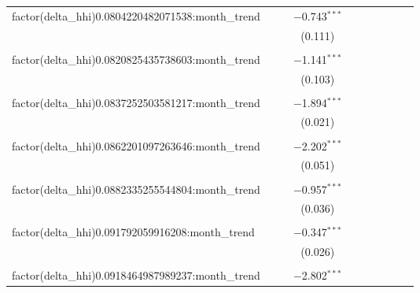 \begin{table}[H]
{\begin{tabular}{@{\extracolsep{5pt}}lccccccccc}
  factor(delta\_hhi)0.0804220482071538:month\_trend &  &  & $-$0.743$^{***}$ &  &  &  &  &  &  \\  

   &  &  & (0.111) &  &  &  &  &  &  \\  

   & & & & & & & & & \\  

  factor(delta\_hhi)0.0820825435738603:month\_trend &  &  & $-$1.141$^{***}$ &  &  &  &  &  &  \\  

   &  &  & (0.103) &  &  &  &  &  &  \\  

   & & & & & & & & & \\  

  factor(delta\_hhi)0.0837252503581217:month\_trend &  &  & $-$1.894$^{***}$ &  &  &  &  &  &  \\  

   &  &  & (0.021) &  &  &  &  &  &  \\  

   & & & & & & & & & \\  

  factor(delta\_hhi)0.0862201097263646:month\_trend &  &  & $-$2.202$^{***}$ &  &  &  &  &  &  \\  

   &  &  & (0.051) &  &  &  &  &  &  \\  

   & & & & & & & & & \\  

  factor(delta\_hhi)0.0882335255544804:month\_trend &  &  & $-$0.957$^{***}$ &  &  &  &  &  &  \\  

   &  &  & (0.036) &  &  &  &  &  &  \\  

   & & & & & & & & & \\  

  factor(delta\_hhi)0.091792059916208:month\_trend &  &  & $-$0.347$^{***}$ &  &  &  &  &  &  \\  

   &  &  & (0.026) &  &  &  &  &  &  \\  

   & & & & & & & & & \\  

  factor(delta\_hhi)0.0918464987989237:month\_trend &  &  & $-$2.802$^{***}$ &  &  &  &  &  &  \\  


\end{tabular}}
\end{table}
